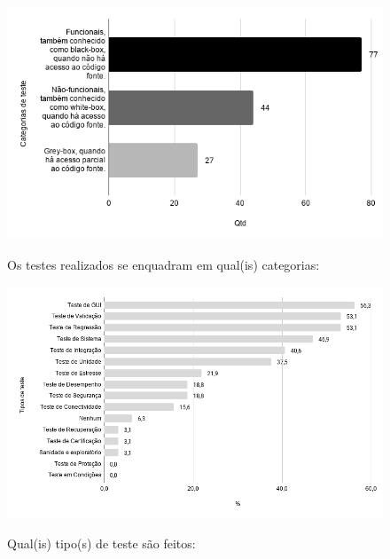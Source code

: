     
        \begin{figure}[!htb]
        \centering
        \includegraphics[width=.80\textwidth]{images/s_categoriastestes.png}
        \label{figure:s_categoriastestes}
        \caption{Os testes realizados se enquadram em qual(is) categorias:}
        \end{figure}       
    
  
        \begin{figure}[!htb]
        \centering
        \includegraphics[width=.90\textwidth]{images/s_tipostestes.png}
        \label{figure:s_tipostestes}
        \caption{Qual(is) tipo(s) de teste são feitos:}
        \end{figure}
    
